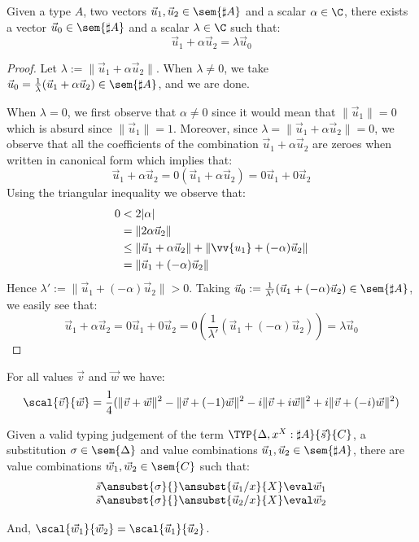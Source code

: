 \begin{lemma}\label{lem:VecRewrite}%
Given a type $A$, two vectors $\vec{u}_{1},\vec{u}_{2}\in\sem{\sharp A}$ and a scalar $\alpha\in\C$, there exists a vector $\vec{u}_{0}\in\sem{\sharp A}$ and a scalar $\lambda\in\C$ such that:
\[
\vec{u}_{1} + \alpha\vec{u}_{2} = \lambda \vec{u}_{0} 
\]
\end{lemma}
\begin{proof}
    Let $\lambda:=\|\vec{u}_{1}+\alpha\vec{u}_{2}\|$. When $\lambda\neq 0$, we take $\vec{u}_{0}=\frac{1}{\lambda}(\vec{u}_{1}+\alpha\vec{u}_{2})\in\sem{\sharp A}$, and we are done.

    When $\lambda=0$, we first observe that $\alpha\neq 0$ since it would mean that $\|\vec{u}_{1}\|=0$ which is absurd since $\|\vec{u}_{1}\|=1$. Moreover, since $\lambda=\|\vec{u}_{1}+\alpha\vec{u}_{2}\|=0$, we observe that all the coefficients of the combination $\vec{u}_{1}+\alpha\vec{u}_{2}$ are zeroes when written in canonical form which implies that:
    \[
    \vec{u}_{1}+\alpha\vec{u}_{2} = 0(\vec{u}_{1}+\alpha\vec{u}_{2}) = 0\vec{u}_{1}+0\vec{u}_{2}
    \]
    Using the triangular inequality we observe that:
    \begin{align*}
    0 &< 2|\alpha|\\
    &= \|2\alpha\vec{u}_{2}\|\\
    &\leq\|\vec{u}_{1}+\alpha\vec{u}_{2}\| + \|\vv{u_1 }+ (-\alpha)\vec{u}_{2}\|\\
    &= \|\vec{u}_{1}+(-\alpha)\vec{u}_{2}\|
    \end{align*}
    Hence $\lambda' := \|\vec{u}_{1}+(-\alpha)\vec{u}_{2}\|>0$. Taking $\vec{u}_{0}:= \frac{1}{\lambda'}(\vec{u}_{1}+ (-\alpha)\vec{u}_{2})\in\sem{\sharp A}$, we easily see that:
    \[
    \vec{u}_{1}+\alpha\vec{u}_{2} = 0\vec{u}_{1} + 0\vec{u}_{2} = 0(\frac{1}{\lambda'} (\vec{u}_{1} + (-\alpha) \vec{u}_{2})) = \lambda \vec{u}_{0}
    \tag*{\qedhere}
    \]
\end{proof}

\begin{theorem}\label{prop:Polarization} %
For all values $\vec{v}$ and $\vec{w}$ we have:
\[
  \scal{\vec{v}}{\vec{w}}=
  \frac{1}{4} (\|\vec{v}+\vec{w}\|^2 - \|\vec{v} + (-1) \vec{w}\|^2 - i\|\vec{v} + i\vec{w}\|^2 + i\|\vec{v}+ (-i)\vec{w}\|^2)
\]
\end{theorem}

\begin{lemma}\label{lem:InnerProdSingleVar} 
Given a valid typing judgement of the term $\TYP{\Delta,x^X:\sharp A}{\vec{s}}{C}$, a substitution $\sigma\in\sem{\Delta}$ and value combinations $\vec{u}_{1},\vec{u}_{2}\in\sem{\sharp A}$, there are value combinations $\vec{w}_{1}, \vec{w}_{2}\in\sem{C}$ such that:
\[
\begin{array}{c}
    \vec{s}\ansubst{\sigma}{}\ansubst{\vec{u}_{1}/x}{X}\eval\vec{w}_{1}\\
    \vec{s}\ansubst{\sigma}{}\ansubst{\vec{u}_{2}/x}{X}\eval\vec{w}_{2}
\end{array}
\]

And, $\scal{\vec{w}_{1}}{\vec{w}_{2}} = \scal{\vec{u}_{1}}{\vec{u}_{2}}$.
\end{lemma}

